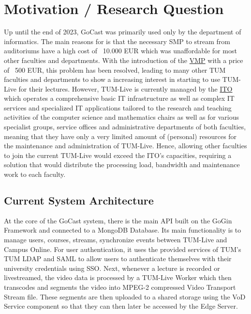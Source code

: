 \section{Motivation / Research Question}

Up until the end of 2023, GoCast was primarily used only by the department of informatics. The main reasons for is that the necessary \ac{SMP} to stream from auditoriums have a high cost of ~10.000 EUR which was unaffordable for most other faculties and departments.
With the introduction of the \href{https://github.com/TUM-Dev/VMP/}{\ac{VMP}} with a price of ~500 EUR, this problem has been resolved, leading to many other TUM faculties and departments to show a increasing interest in starting to use TUM-Live for their lectures. However, TUM-Live is currently managed by the \href{https://www.cit.tum.de/ito/die-ito/}{\ac{ITO}} which operates a comprehensive basic IT infrastructure as well as complex IT services and specialized IT applications tailored to the research and teaching activities of the computer science and mathematics chairs as well as for various specialist groups, service offices and administrative departments of both faculties, meaning that they have only a very limited amount of (personal) resources for the maintenance and administration of TUM-Live. Hence, allowing other faculties to join the current TUM-Live would exceed the \ac{ITO}'s capacities, requiring a solution that would distribute the processing load, bandwidth and maintenance work to each faculty. 

\subsection{Current System Architecture}

At the core of the GoCast system, there is the main \ac{API} built on the GoGin Framework and connected to a MongoDB Database. Its main functionality is to manage users, courses, streams, synchronize events between TUM-Live and Campus Online. For user authentication, it uses the provided services of \ac{TUM}'s \ac{TUM} \ac{LDAP} and \ac{SAML} to allow users to authenticate themselves with their university credentials using \ac{SSO}. 
Next, whenever a lecture is recorded or livestreamed, the video data is processed by a TUM-Live Worker which then transcodes and segments the video into MPEG-2 compressed Video Transport Stream file. These segments are then uploaded to a shared storage using the VoD Service component so that they can then later be accessed by the Edge Server.

